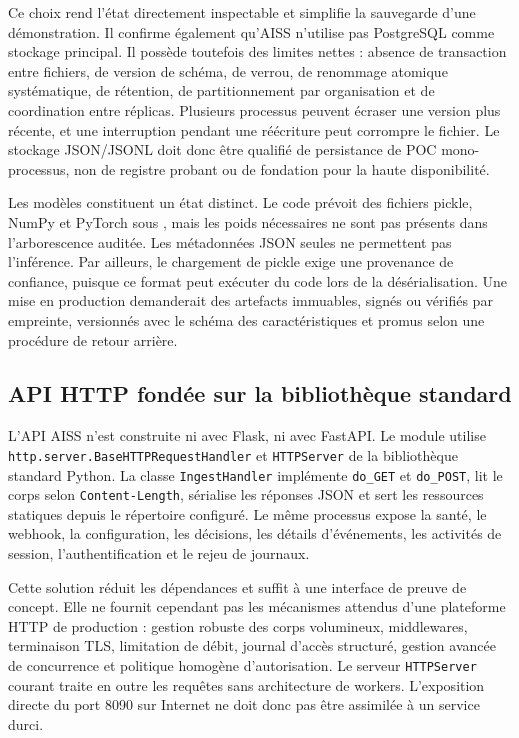 \documentclass[11pt,a4paper,oneside]{report}
\theoremstyle{definition}
\theoremstyle{plain}
\begin{document}
Ce choix rend l'état directement inspectable et simplifie la sauvegarde d'une
démonstration. Il confirme également qu'AISS n'utilise pas PostgreSQL comme
stockage principal. Il possède toutefois des limites nettes : absence de
transaction entre fichiers, de version de schéma, de verrou, de renommage
atomique systématique, de rétention, de partitionnement par organisation et
de coordination entre réplicas. Plusieurs processus peuvent écraser une
version plus récente, et une interruption pendant une réécriture peut
corrompre le fichier. Le stockage JSON/JSONL doit donc être qualifié de
persistance de POC mono-processus, non de registre probant ou de fondation
pour la haute disponibilité.

Les modèles constituent un état distinct. Le code prévoit des fichiers
pickle, NumPy et PyTorch sous , mais les poids nécessaires
ne sont pas présents dans l'arborescence auditée. Les métadonnées JSON seules
ne permettent pas l'inférence. Par ailleurs, le chargement de pickle exige
une provenance de confiance, puisque ce format peut exécuter du code lors de
la désérialisation. Une mise en production demanderait des artefacts
immuables, signés ou vérifiés par empreinte, versionnés avec le schéma des
caractéristiques et promus selon une procédure de retour arrière.

\subsection{API HTTP fondée sur la bibliothèque standard}

L'API AISS n'est construite ni avec Flask, ni avec FastAPI. Le module
 utilise
\texttt{http.server.BaseHTTPRequestHandler} et \texttt{HTTPServer} de la
bibliothèque standard Python. La classe \texttt{IngestHandler} implémente
\texttt{do\_GET} et \texttt{do\_POST}, lit le corps selon
\texttt{Content-Length}, sérialise les réponses JSON et sert les ressources
statiques depuis le répertoire configuré. Le même processus expose la santé,
le webhook, la configuration, les décisions, les détails d'événements, les
activités de session, l'authentification et le rejeu de journaux.

Cette solution réduit les dépendances et suffit à une interface de preuve de
concept. Elle ne fournit cependant pas les mécanismes attendus d'une
plateforme HTTP de production : gestion robuste des corps volumineux,
middlewares, terminaison TLS, limitation de débit, journal d'accès structuré,
gestion avancée de concurrence et politique homogène d'autorisation. Le
serveur \texttt{HTTPServer} courant traite en outre les requêtes sans
architecture de workers. L'exposition directe du port 8090 sur Internet ne
doit donc pas être assimilée à un service durci.
\end{document}
